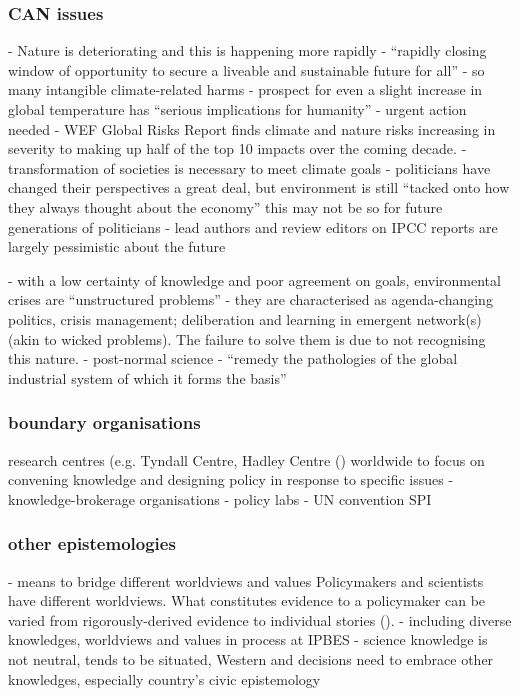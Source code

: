 \subsubsection{CAN issues}
\cite{IPBES2022} - Nature is deteriorating and this is happening more rapidly
\cite{IIPCC2022} - ``rapidly closing window of opportunity to secure a liveable and sustainable future for all''
\cite{TschakertEAKO2019} - so many intangible climate-related harms
\cite{McKayEtAl2022} - prospect for even a slight increase in global temperature has ``serious implications for humanity''  - urgent action needed  
\cite{WEF2024} - WEF Global Risks Report finds climate and nature risks increasing in severity to making up half of the top 10 impacts over the coming decade. 
\cite{LaybournTS2023} - transformation of societies is necessary to meet climate goals
\cite{Killick2023} -  politicians have changed their perspectives a great deal, but environment is still ``tacked onto how they always thought about the economy'' this may not be so for future generations of politicians
\cite{Carrington2024} - lead authors and review editors on IPCC reports are largely pessimistic about the future

\cite{WesselinkH2020} - with a low certainty of knowledge and poor agreement on goals, environmental crises are ``unstructured problems'' - they are characterised as agenda-changing politics, crisis management; deliberation and learning in emergent network(s) (akin to \cite{RittelW1973} wicked problems). The failure to solve them is due to not recognising this nature.
\cite[p739]{FuntowiczR1993} - post-normal science - ``remedy the pathologies of the global industrial system of which it forms the basis''

\subsubsection{boundary organisations}
research centres (e.g. Tyndall Centre, Hadley Centre (\cite{WesselinkH2020}) 
worldwide to focus on convening knowledge and designing policy in response to specific issues
\cite{MacKillopCDD2023} - knowledge-brokerage organisations
\cite{OlejniczakBDP2019} - policy labs
\cite{VelanderD2024} - UN convention SPI

\subsubsection{other epistemologies}
\cite{PascualEtAl2018} - means to bridge different worldviews and values
Policymakers and scientists have different worldviews. What constitutes evidence to a policymaker can be varied from rigorously-derived evidence to individual stories (\cite{PiddingtonMD2024}).
\cite{MatukBSAHT2020} - including diverse knowledges, worldviews and values in process at IPBES
\cite{IbarraJOBCIMRS2022} - science knowledge is not neutral, tends to be situated, Western and decisions need to embrace other knowledges, especially country's civic epistemology

